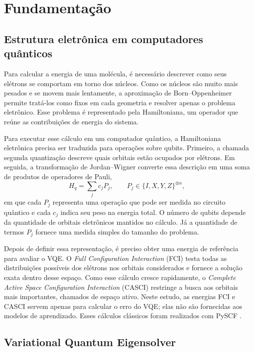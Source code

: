 \section{Fundamentação}

\subsection{Estrutura eletrônica em computadores quânticos}

Para calcular a energia de uma molécula, é necessário descrever como seus
elétrons se comportam em torno dos núcleos. Como os núcleos são muito mais
pesados e se movem mais lentamente, a aproximação de Born--Oppenheimer permite
tratá-los como fixos em cada geometria e resolver apenas o problema eletrônico.
Esse problema é representado pela Hamiltoniana, um operador que reúne as
contribuições de energia do sistema.

Para executar esse cálculo em um computador quântico, a Hamiltoniana eletrônica
precisa ser traduzida para operações sobre qubits. Primeiro, a chamada segunda
quantização descreve quais orbitais estão ocupados por elétrons. Em seguida, a
transformação de Jordan--Wigner converte essa descrição em uma soma de produtos
de operadores de Pauli,
\begin{equation}
 H_q = \sum_j c_j P_j, \qquad
 P_j \in \{I,X,Y,Z\}^{\otimes n},
\end{equation}
em que cada $P_j$ representa uma operação que pode ser medida no circuito
quântico e cada $c_j$ indica seu peso na energia total. O número de qubits
depende da quantidade de orbitais eletrônicos mantidos no cálculo. Já a
quantidade de termos $P_j$ fornece uma medida simples do tamanho do problema.

Depois de definir essa representação, é preciso obter uma energia de referência
para avaliar o VQE. O \textit{Full Configuration Interaction} (FCI) testa todas
as distribuições possíveis dos elétrons nos orbitais considerados e fornece a
solução exata dentro desse espaço. Como esse cálculo cresce rapidamente, o
\textit{Complete Active Space Configuration Interaction} (CASCI) restringe a
busca aos orbitais mais importantes, chamados de espaço ativo. Neste estudo, as
energias FCI e CASCI servem apenas para calcular o erro do VQE; elas não são
fornecidas aos modelos de aprendizado. Esses cálculos clássicos foram realizados
com PySCF \cite{sun2018pyscf}.

\subsection{Variational Quantum Eigensolver}


